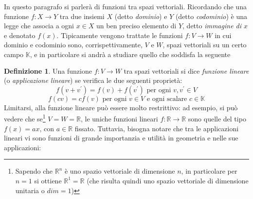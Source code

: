 \documentclass{book}
\theoremstyle{definition}
\newtheorem{defi}{Definizione}[section]
\theoremstyle{plain}
\begin{document}
In questo paragrafo si parlerà di funzioni tra spazi vettoriali.
Ricordando che una funzione $f:X\to Y$ tra due insiemi $X$
(detto \textit{dominio}) e $Y$ (detto \textit{codominio}) è una legge che
associa a ogni $x\in X$ un ben preciso elemento di $Y$, detto
\textit{immagine di $x$} e denotato $f(x)$.
Tipicamente vengono trattate le funzioni $f:V\to W$ in cui dominio e
codominio sono, corrispettivamente, $V$ e $W$, spazi vettoriali su un
certo campo $\mathds{K}$, e in particolare si andrà a studiare quello che
soddisfa la seguente
\begin{defi}
  \label{defi:applindefes}
  Una funzione $f:V\to W$ tra spazi vettoriali si dice \textit{funzione
    lineare} (o \textit{applicazione lineare}) se verifica le due seguenti
  proprietà:
  \begin{equation}
    \label{eq:applindefes1}
    f(v+v^\prime)=f(v)+f(v^\prime) \text{ per ogni } v,v^\prime \in V 
  \end{equation}
  \begin{equation}
    \label{eq:applindefes2}
    f(cv)=cf(v) \text{ per ogni $v\in V$ e ogni scalare } c\in\mathds{K}
  \end{equation}
  Limitarsi, alla funzione lineare può essere molto restrittivo: ad
  esempio, si può vedere che se\footnote{Sapendo che $\mathds{R}^n$ è uno
    spazio vettoriale di dimensione $n$, in particolare per $n=1$ si
    ottiene $\mathds{R}^1=\mathds{R}$ (che risulta quindi uno spazio
    vettoriale di dimensione unitaria o $dim = 1$)} $V=W=\mathds{R}$, le
  uniche funzioni lineari $f:\mathds{R} \to \mathds{R}$ sono quelle del
  tipo $f(x)=ax$, con $a\in \mathds{R}$ fissato. Tuttavia, bisogna notare
  che tra le applicazioni lineari vi sono funzioni di grande importanzia
  e utilità in geometria e nelle sue applicazioni:
\end{defi}
\end{document}

